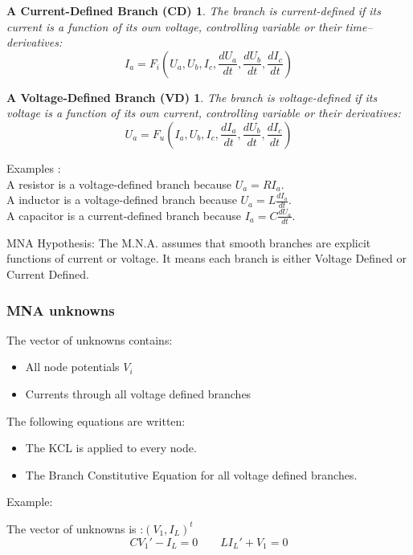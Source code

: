 \frame
{
\newtheorem{mur}{A Current-Defined Branch (CD)}
\begin{mur}
The branch is current-defined if its current is a function of its own voltage, controlling variable
or their time--derivatives:
\begin{equation}\label{CD}I_{a}=F_{i}(U_{a},U_{b},I_{c},\frac{dU_a}{dt},\frac{dU_b}{dt},\frac{dI_{c}}{dt})\end{equation}
\end{mur}
\newtheorem{mur_}{A Voltage-Defined Branch (VD)}
\begin{mur_}
The branch is voltage-defined if its voltage is a function of its own current, controlling variable
or their derivatives:
\begin{equation}\label{VD}U_{a}=F_{u}(I_{a},U_{b},I_{c},\frac{dI_a}{dt},\frac{dU_b}{dt},\frac{dI_{c}}{dt})\end{equation}
\end{mur_}
Examples : \\
A resistor is a voltage-defined branch because $U_{a}=RI_{a}$.\\
A inductor is a voltage-defined branch because $U_{a}=L\frac{dI_{a}}{dt}$.\\
A capacitor is a current-defined branch because $I_{a}=C\frac{dU_{a}}{dt}$.\\

 \begin{block}{MNA Hypothesis:}
The M.N.A. assumes that smooth branches are explicit functions of current or voltage. It means each
branch is either Voltage Defined or Current Defined.
  \end{block}
}
\frame
{
\frametitle{MNA unknowns}
 \begin{block}{The vector of unknowns contains:}
\begin{itemize}
\item All node potentials $V_{i}$
\item Currents through all voltage defined branches
\end{itemize}
\end{block}

 \begin{block}{The following equations are written:}
\begin{itemize}
\item The KCL is applied to every node.
\item The Branch Constitutive Equation for all voltage defined branches.
\end{itemize}
\end{block}
Example:
  \begin{figure}[h]
   \centerline{
   \scalebox{0.5}{
    
  }
 } 
 \end{figure}

The vector of unknowns is :$(V_{1},I_{L})^{t}$
\[CV_{1}'-I_{L}=0 \qquad LI_{L}'+V_{1}=0\]

}